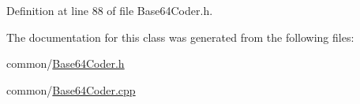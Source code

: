 \-Definition at line 88 of file \-Base64\-Coder.\-h.



\-The documentation for this class was generated from the following files\-:\begin{DoxyCompactItemize}
\item 
common/\hyperlink{_base64_coder_8h}{\-Base64\-Coder.\-h}\item 
common/\hyperlink{_base64_coder_8cpp}{\-Base64\-Coder.\-cpp}\end{DoxyCompactItemize}
